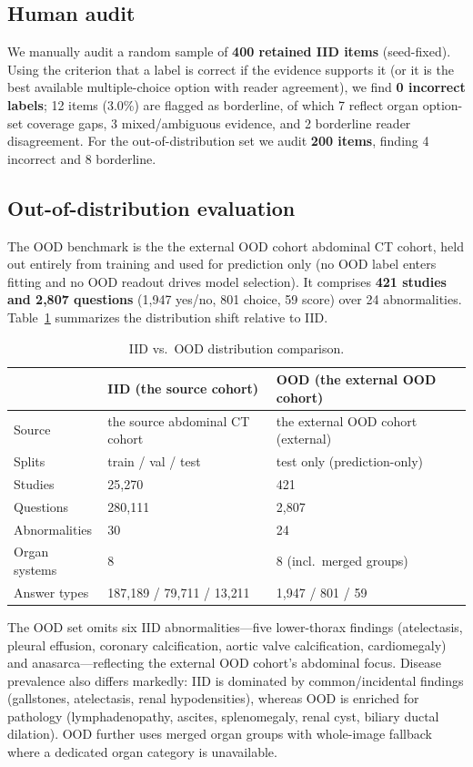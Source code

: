 \subsection{Human audit}
We manually audit a random sample of \textbf{400 retained IID items}
(seed-fixed). Using the criterion that a label is correct if the evidence supports
it (or it is the best available multiple-choice option with reader agreement), we
find \textbf{0 incorrect labels}; 12 items (3.0\%) are flagged as borderline, of
which 7 reflect organ option-set coverage gaps, 3 mixed/ambiguous evidence, and 2
borderline reader disagreement. For the out-of-distribution set we audit
\textbf{200 items}, finding 4 incorrect and 8 borderline.

\subsection{Out-of-distribution evaluation}
The OOD benchmark is the the external OOD cohort abdominal CT cohort, held out entirely from
training and used for prediction only (no OOD label enters fitting and no OOD
readout drives model selection). It comprises \textbf{421 studies and 2{,}807
questions} (1{,}947 yes/no, 801 choice, 59 score) over 24 abnormalities.
Table~\ref{tab:oodiid} summarizes the distribution shift relative to IID.

\begin{table}[t]
\centering
\caption{IID vs.\ OOD distribution comparison.}
\label{tab:oodiid}
\begin{tabular}{lll}
\toprule
 & IID (the source cohort) & OOD (the external OOD cohort) \\
\midrule
Source            & the source abdominal CT cohort & the external OOD cohort (external) \\
Splits            & train / val / test & test only (prediction-only) \\
Studies           & 25{,}270 & 421 \\
Questions         & 280{,}111 & 2{,}807 \\
Abnormalities     & 30 & 24 \\
Organ systems     & 8 & 8 (incl.\ merged groups) \\
Answer types      & 187{,}189 / 79{,}711 / 13{,}211 & 1{,}947 / 801 / 59 \\
\bottomrule
\end{tabular}
\end{table}

The OOD set omits six IID abnormalities---five lower-thorax findings
(atelectasis, pleural effusion, coronary calcification, aortic valve
calcification, cardiomegaly) and anasarca---reflecting the external OOD cohort's abdominal focus.
Disease prevalence also differs markedly: IID is dominated by common/incidental
findings (gallstones, atelectasis, renal hypodensities), whereas OOD is enriched
for pathology (lymphadenopathy, ascites, splenomegaly, renal cyst, biliary ductal
dilation). OOD further uses merged organ groups with whole-image fallback where a
dedicated organ category is unavailable.